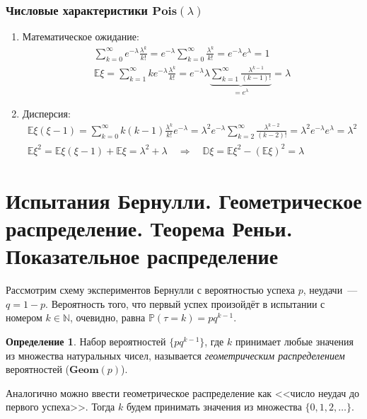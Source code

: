 \documentclass[oneside,final,14pt]{extreport}
\newcommand\myprob[1]{{\mathbb{P}(#1)}}
\theoremstyle{plain}
\theoremstyle{definition}
\newtheorem*{defn}{Определение}
\theoremstyle{named}
\begin{document}
\subsubsection{Числовые характеристики $\mathbf{Pois}(\lambda)$}
\begin{enumerate}
    \item Математическое ожидание:
    \begin{align*}
        \sum\limits_{k=0}^{\infty} e^{-\lambda} \frac{\lambda^k}{k!} = e^{-\lambda} \sum\limits_{k=0}^{\infty} \frac{\lambda^k}{k!} = e^{-\lambda} e^\lambda = 1 \\
        \mathbb{E}\xi = \sum\limits_{k=1}^{\infty} k e^{-\lambda} \frac{\lambda^k}{k!} = e^{-\lambda} \lambda \underbrace{\sum\limits_{k=1}^{\infty} \frac{\lambda^{k-1}}{(k - 1)!}}_{= e^\lambda} = \lambda
    \end{align*}
    \item Дисперсия:
    \begin{align*}
        \mathbb{E}\xi(\xi - 1) = \sum\limits_{k=0}^{\infty} k (k - 1) \frac{\lambda^k}{k!} e^{-\lambda}  = \lambda^2 e^{-\lambda} \sum\limits_{k=2}^{\infty} \frac{\lambda^{k-2}}{(k-2)!} = \lambda^2 e^{-\lambda} e^\lambda = \lambda^2 \\
        \mathbb{E}\xi^2 = \mathbb{E}\xi(\xi - 1) + \mathbb{E}\xi = \lambda^2 + \lambda \quad \Rightarrow \quad \mathbb{D}\xi = \mathbb{E}\xi^2 - (\mathbb{E}\xi)^2 = \lambda
    \end{align*}
\end{enumerate}

\section{Испытания Бернулли. Геометрическое распределение. Теорема Реньи. Показательное распределение}
Рассмотрим схему экспериментов Бернулли с вероятностью успеха $p$, неудачи~--- $q = 1 - p$. Вероятность того, что первый успех произойдёт в испытании с номером $k \in \mathbb{N}$, очевидно, равна $\myprob{\tau = k} = pq^{k-1}$.

\begin{defn}
    Набор вероятностей $\{p q^{k-1}\}$, где $k$ принимает любые значения из множества натуральных чисел, называется {\it геометрическим распределением} вероятностей ($\mathbf{Geom}(p)$).
\end{defn}

Аналогично можно ввести геометрическое распределение как <<число неудач до первого успеха>>. Тогда $k$ будем принимать значения из множества $\{0, 1, 2, \ldots\}$.
\end{document}

